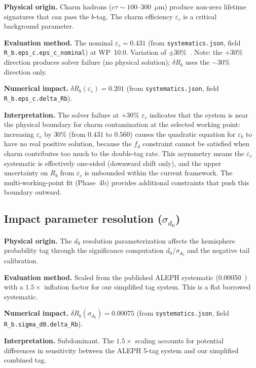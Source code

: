 \documentclass[11pt,a4paper]{article}
\begin{document}
\textbf{Physical origin.} Charm hadrons ($c\tau \sim 100$--300~$\mu$m) produce
non-zero lifetime signatures that can pass the $b$-tag. The charm efficiency
$\varepsilon_c$ is a critical background parameter.

\textbf{Evaluation method.} The nominal $\varepsilon_c = 0.431$
(from \texttt{systematics.json}, field \texttt{R\_b.eps\_c.eps\_c\_nominal})
at WP~10.0. Variation of $\pm 30\%$~\cite{LEP:HF:2001}. Note: the $+30\%$ direction
produces solver failure (no physical solution); $\delta R_b$ uses the $-30\%$ direction
only.

\textbf{Numerical impact.}
$\delta R_b(\varepsilon_c) = 0.201$
(from \texttt{systematics.json}, field \texttt{R\_b.eps\_c.delta\_Rb}).

\textbf{Interpretation.} The solver failure at $+30\%$ $\varepsilon_c$ indicates
that the system is near the physical boundary for charm contamination at the
selected working point: increasing $\varepsilon_c$ by $30\%$ (from $0.431$ to
$0.560$) causes the quadratic equation for $\varepsilon_b$ to have no real
positive solution, because the $f_d$ constraint cannot be satisfied when charm
contributes too much to the double-tag rate. This asymmetry means the
$\varepsilon_c$ systematic is effectively one-sided (downward shift only), and
the upper uncertainty on $R_b$ from $\varepsilon_c$ is unbounded within the
current framework. The multi-working-point fit (Phase~4b) provides additional
constraints that push this boundary outward.

\subsection{Impact parameter resolution ($\sigma_{d_0}$)}
\label{sec:syst_sigma_d0}

\textbf{Physical origin.} The $d_0$ resolution parameterization affects the hemisphere
probability tag through the significance computation $d_0/\sigma_{d_0}$ and the negative
tail calibration.

\textbf{Evaluation method.} Scaled from the published ALEPH systematic
(0.00050~\cite{ALEPH:Rb:1996}) with a $1.5\times$ inflation factor for our simplified
tag system. This is a flat borrowed systematic.

\textbf{Numerical impact.}
$\delta R_b(\sigma_{d_0}) = 0.00075$
(from \texttt{systematics.json}, field \texttt{R\_b.sigma\_d0.delta\_Rb}).

\textbf{Interpretation.} Subdominant. The $1.5\times$ scaling accounts for potential
differences in sensitivity between the ALEPH 5-tag system and our simplified combined tag.
\end{document}

